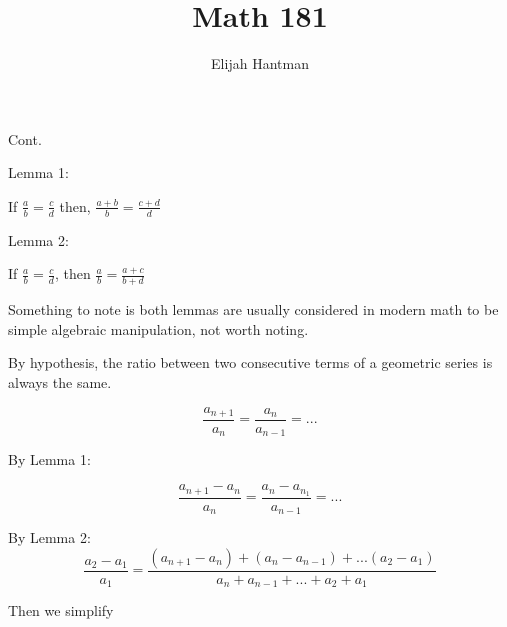 \documentclass{report}
\title{\Huge{Math 181}}
\author{\huge{Elijah Hantman}}
\date{}
\begin{document}
\maketitle
\newpage

\begin{description}
    \item {\large Cont.} 
        \begin{mdframed}
          Lemma 1:  
          \begin{mdframed}
              If $\frac{a}{b} = \frac{c}{d}$ then,
              $\frac{a+b}{b} = \frac{c+d}{d}$
          \end{mdframed}
          Lemma 2:
          \begin{mdframed}
              If $\frac{a}{b} = \frac{c}{d}$, then
              $\frac{a}{b} = \frac{a+c}{b+d}$ 
          \end{mdframed}

          \begin{mdframed}
              Something to note is both lemmas are usually
              considered in modern math to be simple algebraic
              manipulation, not worth noting.
          \end{mdframed}

          By hypothesis, the ratio between two consecutive
          terms of a geometric series is always the same.

          \begin{displaymath}
              \frac{a_{n+1}}{a_n} = \frac{a_{n}}{a_{n-1}} = ...
          \end{displaymath}

          By Lemma 1:

          \begin{displaymath}
              \frac{a_{n+1} - a_n}{a_n} = \frac{a_n - a_{n_1}}{a_{n-1}} = ...
          \end{displaymath}
          
          By Lemma 2:
          \begin{displaymath}
              \frac{a_2 - a_1}{a_1} = \frac{(a_{n+1} - a_n) + (a_n - a_{n-1}) + ... (a_2 - a_1)}{a_n + a_{n-1} + ... + a_2 + a_1}
          \end{displaymath}
          
          Then we simplify


\end{mdframed}
\end{description}
\end{document}
